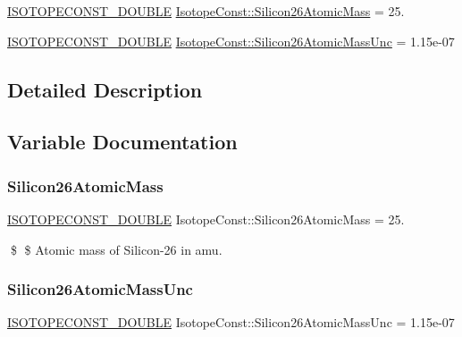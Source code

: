 \begin{DoxyCompactItemize}
\item 
\mbox{\hyperlink{group___isotope_const-_macros_ga8f45a7272ce02c0b4c65c44636ed719a}{I\+S\+O\+T\+O\+P\+E\+C\+O\+N\+S\+T\+\_\+\+D\+O\+U\+B\+LE}} \mbox{\hyperlink{group___isotope_const-_silicon-_si26_ga635d3c2a09a88098b108e762fd2d25bb}{Isotope\+Const\+::\+Silicon26\+Atomic\+Mass}} = 25.
\item 
\mbox{\hyperlink{group___isotope_const-_macros_ga8f45a7272ce02c0b4c65c44636ed719a}{I\+S\+O\+T\+O\+P\+E\+C\+O\+N\+S\+T\+\_\+\+D\+O\+U\+B\+LE}} \mbox{\hyperlink{group___isotope_const-_silicon-_si26_ga96f3da646dfdd0352694661c5f90dc4b}{Isotope\+Const\+::\+Silicon26\+Atomic\+Mass\+Unc}} = 1.\+15e-\/07
\end{DoxyCompactItemize}


\subsection{Detailed Description}


\subsection{Variable Documentation}
\mbox{\label{group___isotope_const-_silicon-_si26_ga635d3c2a09a88098b108e762fd2d25bb}} 
\subsubsection{\texorpdfstring{Silicon26\+Atomic\+Mass}{Silicon26AtomicMass}}
{\footnotesize\ttfamily \mbox{\hyperlink{group___isotope_const-_macros_ga8f45a7272ce02c0b4c65c44636ed719a}{I\+S\+O\+T\+O\+P\+E\+C\+O\+N\+S\+T\+\_\+\+D\+O\+U\+B\+LE}} Isotope\+Const\+::\+Silicon26\+Atomic\+Mass = 25.}

\$ \$ Atomic mass of Silicon-\/26 in amu. \mbox{\label{group___isotope_const-_silicon-_si26_ga96f3da646dfdd0352694661c5f90dc4b}} 
\subsubsection{\texorpdfstring{Silicon26\+Atomic\+Mass\+Unc}{Silicon26AtomicMassUnc}}
{\footnotesize\ttfamily \mbox{\hyperlink{group___isotope_const-_macros_ga8f45a7272ce02c0b4c65c44636ed719a}{I\+S\+O\+T\+O\+P\+E\+C\+O\+N\+S\+T\+\_\+\+D\+O\+U\+B\+LE}} Isotope\+Const\+::\+Silicon26\+Atomic\+Mass\+Unc = 1.\+15e-\/07}

